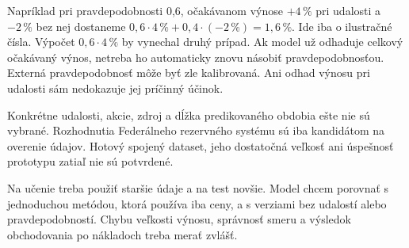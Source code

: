 Napríklad pri pravdepodobnosti 0,6, očakávanom výnose $+4\,\%$ pri udalosti a $-2\,\%$ bez nej dostaneme $0{,}6\cdot4\,\%+0{,}4\cdot(-2\,\%)=1{,}6\,\%$. Ide iba o ilustračné čísla. Výpočet $0{,}6\cdot4\,\%$ by vynechal druhý prípad. Ak model už odhaduje celkový očakávaný výnos, netreba ho automaticky znovu násobiť pravdepodobnosťou. Externá pravdepodobnosť môže byť zle kalibrovaná. Ani odhad výnosu pri udalosti sám nedokazuje jej príčinný účinok.

Konkrétne udalosti, akcie, zdroj a dĺžka predikovaného obdobia ešte nie sú vybrané. Rozhodnutia Federálneho rezervného systému sú iba kandidátom na overenie údajov. Hotový spojený dataset, jeho dostatočná veľkosť ani úspešnosť prototypu zatiaľ nie sú potvrdené.

Na učenie treba použiť staršie údaje a na test novšie. Model chcem porovnať s jednoduchou metódou, ktorá používa iba ceny, a s verziami bez udalostí alebo pravdepodobností. Chybu veľkosti výnosu, správnosť smeru a výsledok obchodovania po nákladoch treba merať zvlášť.
